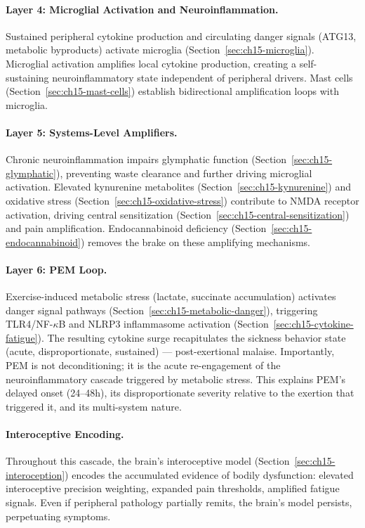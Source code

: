 \paragraph{Layer 4: Microglial Activation and Neuroinflammation.} Sustained peripheral cytokine production and circulating danger signals (ATG13, metabolic byproducts) activate microglia (Section~\ref{sec:ch15-microglia}). Microglial activation amplifies local cytokine production, creating a self-sustaining neuroinflammatory state independent of peripheral drivers. Mast cells (Section~\ref{sec:ch15-mast-cells}) establish bidirectional amplification loops with microglia.

\paragraph{Layer 5: Systems-Level Amplifiers.} Chronic neuroinflammation impairs glymphatic function (Section~\ref{sec:ch15-glymphatic}), preventing waste clearance and further driving microglial activation. Elevated kynurenine metabolites (Section~\ref{sec:ch15-kynurenine}) and oxidative stress (Section~\ref{sec:ch15-oxidative-stress}) contribute to NMDA receptor activation, driving central sensitization (Section~\ref{sec:ch15-central-sensitization}) and pain amplification. Endocannabinoid deficiency (Section~\ref{sec:ch15-endocannabinoid}) removes the brake on these amplifying mechanisms.

\paragraph{Layer 6: PEM Loop.} Exercise-induced metabolic stress (lactate, succinate accumulation) activates danger signal pathways (Section~\ref{sec:ch15-metabolic-danger}), triggering TLR4/NF-$\kappa$B and NLRP3 inflammasome activation (Section~\ref{sec:ch15-cytokine-fatigue}). The resulting cytokine surge recapitulates the sickness behavior state (acute, disproportionate, sustained) --- post-exertional malaise. Importantly, PEM is not deconditioning; it is the acute re-engagement of the neuroinflammatory cascade triggered by metabolic stress. This explains PEM's delayed onset (24--48h), its disproportionate severity relative to the exertion that triggered it, and its multi-system nature.

\paragraph{Interoceptive Encoding.} Throughout this cascade, the brain's interoceptive model (Section~\ref{sec:ch15-interoception}) encodes the accumulated evidence of bodily dysfunction: elevated interoceptive precision weighting, expanded pain thresholds, amplified fatigue signals. Even if peripheral pathology partially remits, the brain's model persists, perpetuating symptoms.

